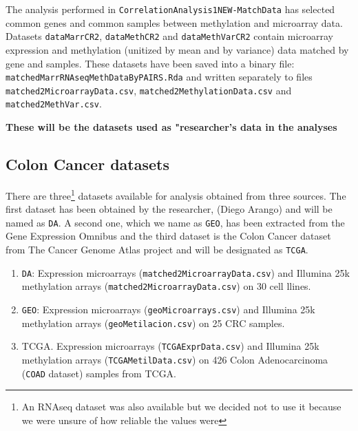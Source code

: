 \documentclass[a4paper,10pt]{article}\usepackage[]{graphicx}\usepackage[]{color}
\begin{document}
The analysis performed in \texttt{CorrelationAnalysis1NEW-MatchData}
has selected common genes and common samples between methylation and microarray data. Datasets \texttt{dataMarrCR2}, \texttt{dataMethCR2} and \texttt{dataMethVarCR2} contain microarray expression and methylation (unitized by mean and by variance) data matched by gene and samples. These datasets have been saved into a binary file: \texttt{matchedMarrRNAseqMethDataByPAIRS.Rda} and written separately to files \texttt{matched2MicroarrayData.csv}, \texttt{matched2MethylationData.csv} and \texttt{matched2MethVar.csv}.

\textbf{These will be the datasets used as "researcher's data in the analyses}

\subsection{Colon Cancer datasets}

There are three\footnote{An RNAseq dataset was also available but we decided not to use it because we were unsure of how reliable the values were} datasets available for analysis obtained from three sources. The first dataset has been obtained by the researcher, (Diego Arango) and will be named as \texttt{DA}. A second one, which we name as \texttt{GEO}, has been extracted from the Gene Expression Omnibus and the third dataset is the Colon Cancer dataset from The Cancer Genome Atlas project and will be designated as \texttt{TCGA}.

\begin{enumerate}
  \item \texttt{DA}: Expression microarrays (\texttt{matched2MicroarrayData.csv}) and Illumina 25k methylation arrays (\texttt{matched2MicroarrayData.csv}) on 30 cell llines.
  \item \texttt{GEO}: Expression microarrays (\texttt{geoMicroarrays.csv}) and Illumina 25k methylation arrays (\texttt{geoMetilacion.csv}) on 25 CRC samples.
\item  TCGA. Expression microarrays (\texttt{TCGAExprData.csv}) and Illumina 25k methylation arrays (\texttt{TCGAMetilData.csv}) on 426 Colon Adenocarcinoma (\texttt{COAD} dataset) samples from TCGA.
\end{enumerate}
\end{document}
